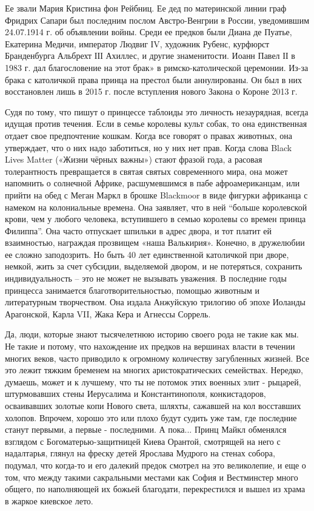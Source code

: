 Ее звали Мария Кристина фон Рейбниц. Ее дед по материнской линии граф Фридрих
Сапари был последним послом Австро-Венгрии в России, уведомившим 24.07.1914 г.
об объявлении войны. Среди ее предков были Диана де Пуатье, Екатерина Медичи,
император Людвиг ІV, художник Рубенс, курфюрст Бранденбурга Альбрехт ІІІ
Ахиллес, и другие знаменитости. Иоанн Павел ІІ в 1983 г. дал благословение на
этот брак» в римско-католической церемонии. Из-за брака с католичкой права
принца на престол были аннулированы. Он был в них восстановлен лишь в 2015 г.
после вступления нового Закона о Короне 2013 г. 


Судя по тому, что пишут о
принцессе таблоиды это личность незаурядная, всегда идущая против течения. Если
в семье королевы культ собак, то она единственная отдает свое предпочтение
кошкам. Когда все говорят о правах животных, она утверждает, что о них надо
заботиться, но у них нет прав. Когда слова Black Lives Matter («Жизни чёрных
важны») стают фразой года, а расовая толерантность превращается в святая святых
современного мира, она может напомнить о солнечной Африке, расшумевшимся в пабе
афроамериканцам, или прийти на обед с Меган Маркл в брошке Blackmoor в виде
фигурки африканца с намеком на колониальные времена. Она заявляет, что в ней
\enquote{больше королевской крови, чем у любого человека, вступившего в семью королевы
со времен принца Филиппа}. Она часто отпускает шпильки в адрес двора, и тот
платит ей взаимностью, награждая прозвищем «наша Валькирия». Конечно, в
дружелюбии ее сложно заподозрить. Но быть 40 лет единственной католичкой при
дворе, немкой, жить за счет субсидии, выделяемой двором, и не потеряться,
сохранить индивидуальность – это не может не вызывать уважения. В последние
годы принцесса занимается благотворительностью, помощью животным и литературным
творчеством. Она издала Анжуйскую трилогию об эпохе Иоланды Арагонской, Карла
VII, Жака Кера и Агнессы Соррель.

Да, люди, которые знают тысячелетнюю историю своего рода не такие как мы. Не
такие и потому, что нахождение их предков на вершинах власти в течении многих
веков, часто приводило  к огромному количеству загубленных жизней. Все это
лежит тяжким бременем на многих аристократических семействах. Нередко, думаешь,
может и к лучшему, что ты не потомок этих  военных элит - рыцарей, штурмовавших
стены Иерусалима и Константинополя, конкистадоров, осваивавших золотые копи
Нового света, шляхты, сажавшей на кол восставших холопов. Впрочем, хорошо это
или плохо будут судить уже там, где последние станут первыми, а первые -
последними. А пока... Принц Майкл обменялся взглядом с Богоматерью-защитницей
Киева Орантой, смотрящей на него с надалтарья, глянул на фреску детей Ярослава
Мудрого на стенах собора, подумал, что когда-то и его далекий предок смотрел на
это великолепие, и еще о том, что между такими сакральными местами как София и
Вестминстер много общего, по наполняющей их божьей благодати, перекрестился и
вышел из храма в жаркое киевское лето.
